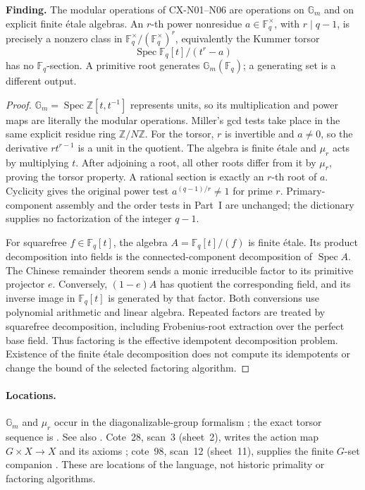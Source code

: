 \documentclass[11pt,a4paper]{article}
\begin{document}
\textbf{Finding.} The modular operations of CX-N01--N06 are operations
on $\mathbb G_m$ and on explicit finite étale algebras.
An $r$-th power nonresidue $a\in\mathbb F_q^\times$, with $r\mid q-1$,
is precisely a nonzero class in
$\mathbb F_q^\times/(\mathbb F_q^\times)^r$, equivalently the Kummer
torsor
\[
 \operatorname{Spec}\mathbb F_q[t]/(t^r-a)
\]
has no $\mathbb F_q$-section.  A primitive root generates
$\mathbb G_m(\mathbb F_q)$; a generating set is a different output.

\begin{proof}
$\mathbb G_m=\operatorname{Spec}\mathbb Z[t,t^{-1}]$ represents units,
so its multiplication and power maps are literally the modular operations.
Miller's gcd tests take place in the same explicit residue ring
$\mathbb Z/N\mathbb Z$.
For the torsor, $r$ is invertible and $a\ne0$, so the derivative
$rt^{r-1}$ is a unit in the quotient.  The algebra is finite étale and
$\mu_r$ acts by multiplying $t$.  After adjoining a root, all other roots
differ from it by $\mu_r$, proving the torsor property.  A rational section
is exactly an $r$-th root of $a$.  Cyclicity gives the original power test
$a^{(q-1)/r}\ne1$ for prime $r$.  Primary-component assembly and the order
tests in Part~I are unchanged; the dictionary supplies no factorization of
the integer $q-1$.

For squarefree $f\in\mathbb F_q[t]$, the algebra
$A=\mathbb F_q[t]/(f)$ is finite étale.  Its product decomposition into
fields is the connected-component decomposition of $\operatorname{Spec}A$.
The Chinese remainder theorem sends a monic irreducible factor to its
primitive projector $e$.  Conversely, $(1-e)A$ has quotient the corresponding
field, and its inverse image in $\mathbb F_q[t]$ is generated by that factor.
Both conversions use polynomial arithmetic and linear algebra.  Repeated
factors are treated by squarefree decomposition, including Frobenius-root
extraction over the perfect base field.  Thus factoring is the effective
idempotent decomposition problem.  Existence of the finite étale
decomposition does not compute its idempotents or change the bound of the
selected factoring algorithm.
\end{proof}

\paragraph{Locations.}
$\mathbb G_m$ and $\mu_r$ occur in the diagonalizable-group formalism
\cite[Exp.~VIII 1.1--1.2]{SGA3}; the exact torsor sequence is
\cite[Exp.~IX 3.2]{SGA4}.  See also \cite[Exp.~V \S7]{SGA1}.
Cote~28, scan~3 (sheet~2), writes the action map $G\times X\to X$ and its
axioms \cite{Archive28}; cote~98, scan~12 (sheet~11), supplies the finite
$G$-set companion \cite{Archive98}.  These are locations of the language,
not historic primality or factoring algorithms.
\end{document}
